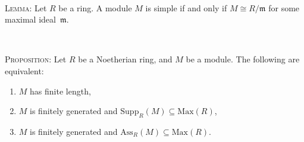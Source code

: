 \documentclass[12pt]{amsart}
\newcommand{\m}{\mathfrak{m}}
\newcommand{\Max}{\mathrm{Max}}
\renewcommand{\1}{\mathbbm{1}}
\begin{document}
\begin{framed}
\
	
	
	\noindent	\textsc{Lemma:} Let $R$ be a ring. A module $M$ is simple if and only if $M\cong R/\m$ for some maximal ideal~$\m$.
	

	
	\
	
	\noindent \textsc{Proposition:} Let $R$ be a Noetherian ring, and $M$ be a module. The following are equivalent:
	\begin{enumerate}
	\item $M$ has finite length,
	\item $M$ is finitely generated and $\mathrm{Supp}_R(M) \subseteq \Max(R)$,
	\item $M$ is finitely generated and $\mathrm{Ass}_R(M) \subseteq \Max(R)$.
	\end{enumerate}
	\end{framed}
\end{document}
